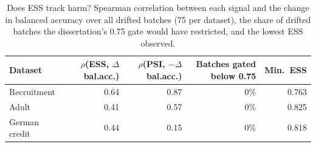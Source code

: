 \begin{table}[t]
\centering
\caption{Does ESS track harm? Spearman correlation between each signal and the change in balanced accuracy over all drifted batches (75 per dataset), the share of drifted batches the dissertation's 0.75 gate would have restricted, and the lowest ESS observed.}
\label{tab:corr}
\small
\setlength{\tabcolsep}{4pt}
\begin{tabular}{lrrrr}
\toprule
Dataset & $\rho$(ESS, $\Delta$bal.acc.) & $\rho$(PSI, $-\Delta$bal.acc.) & Batches gated below 0.75 & Min.~ESS \\
\midrule
Recruitment & 0.64 & 0.87 & 0\% & 0.763 \\
Adult & 0.41 & 0.57 & 0\% & 0.825 \\
German credit & 0.44 & 0.15 & 0\% & 0.818 \\
\bottomrule
\end{tabular}
\end{table}
